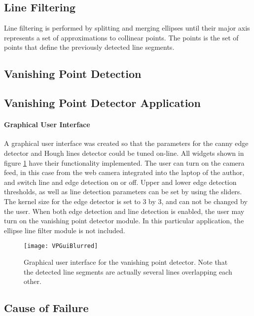\subsection{Line Filtering}

Line filtering is performed by splitting and merging ellipses until their major axis represents a set of approximations to collinear points. The points is the set of points that define the previously detected line segments.

\subsection{Vanishing Point Detection}


\subsection{Vanishing Point Detector Application}

\paragraph{Graphical User Interface}

A graphical user interface was created so that the parameters for the canny edge detector and Hough lines detector could be tuned on-line. All widgets shown in figure \ref{fig:vpGui} have their functionality implemented. The user can turn on the camera feed, in this case from the web camera integrated into the laptop of the author, and switch line and edge detection on or off. Upper and lower edge detection thresholds, as well as line detection parameters can be set by using the sliders. The kernel size for the edge detector is set to 3 by 3, and can not be changed by the user. When both edge detection and line detection is enabled, the user may turn on the vanishing point detector module. In this particular application, the ellipse line filter module is not included.

\begin{figure}
	\texttt{[image: VPGuiBlurred]}
	\caption{Graphical user interface for the vanishing point detector. Note that the detected line segments are actually several lines overlapping each other.}
	\label{fig:vpGui}
\end{figure}

\subsection{Cause of Failure}

